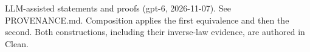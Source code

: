 \documentclass[11pt]{article}
\begin{document}

\bigskip
{\footnotesize LLM-assisted statements and proofs (gpt-6, 2026-11-07).
See PROVENANCE.md. Composition applies the first equivalence and then the second.
Both constructions, including their inverse-law evidence, are authored in Clean.}
\end{document}
